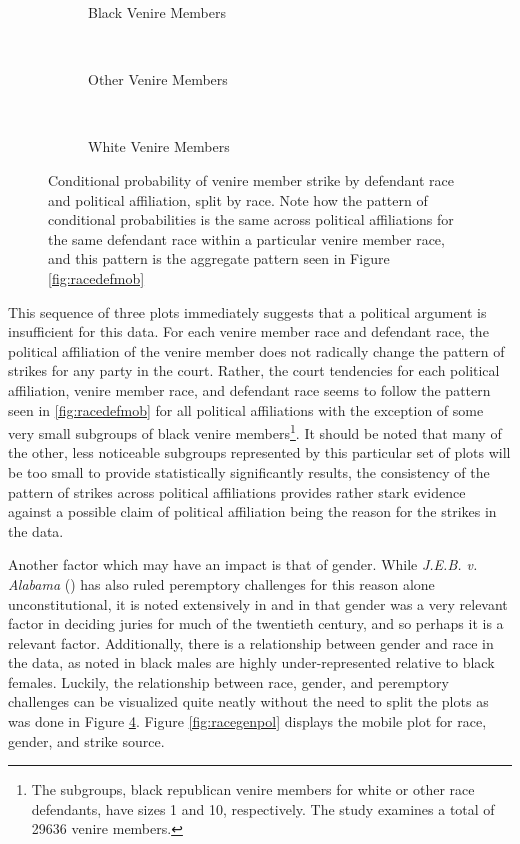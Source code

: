 \begin{figure}[h!]
  \centering
  \begin{subfigure}{0.40\textwidth}
    \caption{Black Venire Members}
    \label{fig:blackdefpol}
  \end{subfigure}
  ~
  \begin{subfigure}{0.40\textwidth}
    \caption{Other Venire Members}
    \label{fig:otherdefpol}
  \end{subfigure}
  ~
  \begin{subfigure}{0.40\textwidth}
    \caption{White Venire Members}
    \label{fig:whitedefpol}
  \end{subfigure}
  \caption[Strikes by Political Affiliation, Race, and Defendant Race (Sunshine)]
  {Conditional probability of venire member strike by defendant race and political affiliation, split by race. Note how the
    pattern of conditional probabilities is the same across political affiliations for the same defendant race within a particular
    venire member race, and this pattern is the aggregate pattern seen in Figure \ref{fig:racedefmob}} \label{fig:racedefpol}
\end{figure}

This sequence of three plots immediately suggests that a political argument is insufficient for this data. For each venire member
race and defendant race, the political affiliation of the venire member does not radically change the pattern of strikes for any
party in the court. Rather, the court tendencies for each political affiliation, venire member race, and defendant race seems to
follow the pattern seen in \ref{fig:racedefmob} for all political affiliations with the exception of some very small subgroups of
black venire members\footnote{The subgroups, black republican venire members for white or other race defendants, have sizes 1 and
  10, respectively. The study examines a total of 29636 venire members.}. It should be noted that many of the other, less
noticeable subgroups represented by this particular set of plots will be too small to provide statistically significantly results,
the consistency of the pattern of strikes across political affiliations provides rather stark evidence against a possible claim of
political affiliation being the reason for the strikes in the data.

Another factor which may have an impact is that of gender. While \textit{J.E.B. v. Alabama} (\cite{jebvalabama}) has also ruled
peremptory challenges for this reason alone unconstitutional, it is noted extensively in \cite{hansvidjudging} and in
\cite{vandykejurysel} that gender was a very relevant factor in deciding juries for much of the twentieth century, and so perhaps
it is a relevant factor. Additionally, there is a relationship between gender and race in the data, as noted in
\cite{JurySunshineProj} black males are highly under-represented relative to black females. Luckily, the relationship between
race, gender, and peremptory challenges can be visualized quite neatly without the need to split the plots as was done in Figure
\ref{fig:racedefpol}. Figure \ref{fig:racegenpol} displays the mobile plot for race, gender, and strike source.

